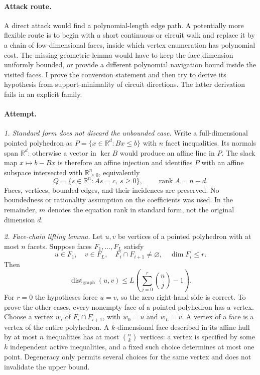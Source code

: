 \documentclass[11pt,a4paper]{article}
\newcommand{\R}{\mathbb{R}}
\begin{document}
\paragraph{Attack route.}
A direct attack would find a polynomial-length edge path. A potentially more
flexible route is to begin with a short continuous or circuit walk and replace
it by a chain of low-dimensional faces, inside which vertex enumeration has
polynomial cost. The missing geometric lemma would have to keep the face
dimension uniformly bounded, or provide a different polynomial navigation
bound inside the visited faces. I prove the conversion statement and then
try to derive its hypothesis from support-minimality of circuit directions.
The latter derivation fails in an explicit family.

\paragraph{Attempt.}
\textit{1. Standard form does not discard the unbounded case.}
Write a full-dimensional pointed polyhedron as
$P=\{x\in\R^d:Bx\le b\}$ with $n$ facet inequalities. Its normals span
$\R^d$: otherwise a vector in $\ker B$ would produce an affine line in $P$.
The slack map $x\mapsto b-Bx$ is therefore an affine injection and identifies
$P$ with an affine subspace intersected with $\R^n_{\ge0}$, equivalently
\[
 Q=\{s\in\R^n:As=c,\ s\ge0\},\qquad\operatorname{rank}A=n-d.
\]
Faces, vertices, bounded edges, and their incidences are preserved. No
boundedness or rationality assumption on the coefficients was used. In the
remainder, $m$ denotes the equation rank in standard form, not the original
dimension $d$.

\textit{2. Face-chain lifting lemma.}
Let $u,v$ be vertices of a pointed polyhedron with at most $n$ facets.
Suppose faces $F_1,\ldots,F_L$ satisfy
\[
 u\in F_1,\quad v\in F_L,\quad
 F_i\cap F_{i+1}\ne\varnothing,\quad \dim F_i\le r.
\]
Then
\[
 \operatorname{dist}_{\mathrm{graph}}(u,v)
 \le L\left(\sum_{j=0}^{r}\binom nj-1\right).                  \tag{213.1}
\]
For $r=0$ the hypotheses force $u=v$, so the zero right-hand side is correct.
To prove the other cases, every nonempty face of a pointed polyhedron has
a vertex. Choose a vertex $w_i$ of $F_i\cap F_{i+1}$, with $w_0=u$ and
$w_L=v$. A vertex of a face is a vertex of the entire polyhedron. A
$k$-dimensional face described in its affine hull by at most $n$ inequalities
has at most $\binom nk$ vertices: a vertex is specified by some $k$
independent active inequalities, and a fixed such choice determines at most
one point. Degeneracy only permits several choices for the same vertex and
does not invalidate the upper bound.
\end{document}
